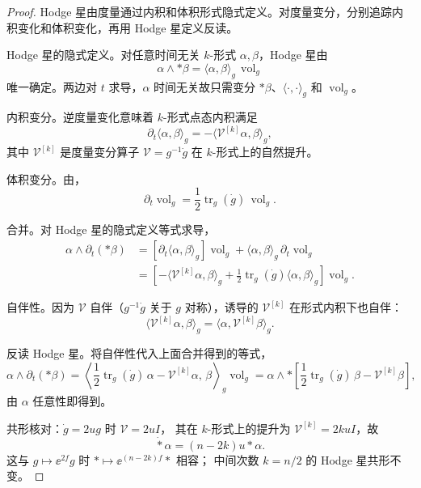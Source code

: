 \begin{proof}
Hodge 星由度量通过内积和体积形式隐式定义。对度量变分，分别追踪内积变化和体积变化，再用 Hodge 星定义反读。

Hodge 星的隐式定义。对任意时间无关 $k$-形式 $\alpha,\beta$，Hodge 星由
\begin{equation*}
 \alpha\wedge *\beta
 =\langle\alpha,\beta\rangle_g\,\operatorname{vol}_g
\end{equation*}
唯一确定。两边对 $t$ 求导，$\alpha$ 时间无关故只需变分 $*\beta$、$\langle\cdot,\cdot\rangle_g$ 和 $\operatorname{vol}_g$。

内积变分。逆度量变化意味着 $k$-形式点态内积满足
\begin{equation*}
 \partial_t\langle\alpha,\beta\rangle_g
 =-\langle \mathcal V^{[k]}\alpha,\beta\rangle_g,
\end{equation*}
其中 $\mathcal V^{[k]}$ 是度量变分算子 $\mathcal V=g^{-1}\dot g$ 在 $k$-形式上的自然提升。

体积变分。由，
\begin{equation*}
 \partial_t\operatorname{vol}_g
 =\frac{1}{2}\operatorname{tr}_g(\dot g)\,\operatorname{vol}_g.
\end{equation*}

合并。对 Hodge 星的隐式定义等式求导，
\begin{align*}
 \alpha\wedge\partial_t(*\beta)
 &=\left[\partial_t\langle\alpha,\beta\rangle_g\right]\operatorname{vol}_g
  +\langle\alpha,\beta\rangle_g\,\partial_t\operatorname{vol}_g\\
 &=\left[
  -\langle \mathcal V^{[k]}\alpha,\beta\rangle_g
  +\frac{1}{2}\operatorname{tr}_g(\dot g)
  \langle\alpha,\beta\rangle_g
 \right]\operatorname{vol}_g.
\end{align*}

自伴性。因为 $\mathcal V$ 自伴（$g^{-1}\dot g$ 关于 $g$ 对称），诱导的 $\mathcal V^{[k]}$ 在形式内积下也自伴：
\begin{equation*}
 \langle \mathcal V^{[k]}\alpha,\beta\rangle_g
 =\langle\alpha,\mathcal V^{[k]}\beta\rangle_g.
\end{equation*}

反读 Hodge 星。将自伴性代入上面合并得到的等式，
\begin{equation*}
 \alpha\wedge\partial_t(*\beta)
 =\left\langle
  \frac{1}{2}\operatorname{tr}_g(\dot g)\,\alpha
  -\mathcal V^{[k]}\alpha,\,
  \beta
 \right\rangle_g\operatorname{vol}_g
 =\alpha\wedge *\left[
  \frac{1}{2}\operatorname{tr}_g(\dot g)\,\beta
  -\mathcal V^{[k]}\beta
 \right],
\end{equation*}
由 $\alpha$ 任意性即得到。

共形核对：$\dot g=2ug$ 时 $\mathcal V=2uI$，
其在 $k$-形式上的提升为 $\mathcal V^{[k]}=2kuI$，故
\[
\dot *\alpha=(n-2k)u*\alpha.
\]
这与 $g\mapsto \ee^{2f}g$ 时 $*\mapsto \ee^{(n-2k)f}*$ 相容；
中间次数 $k=n/2$ 的 Hodge 星共形不变。
\end{proof}


